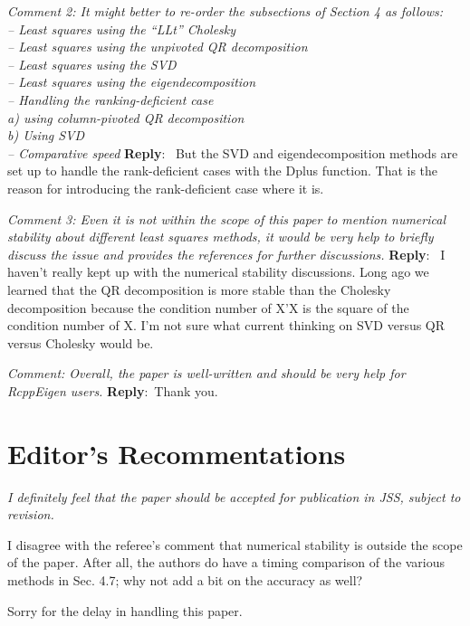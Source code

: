 \documentclass[10pt]{article}
\newcommand{\pointRaised}[2]{\smallskip %
  \textsl{{\fontseries{b}\selectfont #1}: #2}\newline}
\newcommand{\reply}[1]{\textbf{Reply}:\ #1 \smallskip } %
\begin{document}
\pointRaised{Comment 2}{
  It might better to re-order the subsections of Section 4 as follows: \\
  -- Least squares using the ``LLt'' Cholesky \\
  -- Least squares using the unpivoted QR decomposition\\
  -- Least squares using the SVD \\
  -- Least squares using the eigendecomposition \\
  -- Handling the ranking-deficient case \\
  \phantom{---} a) using column-pivoted QR decomposition \\
  \phantom{---} b) Using SVD \\
  -- Comparative speed 
}
\reply{
  But the SVD and eigendecomposition methods are set up to handle
  the rank-deficient cases with the Dplus function.  That is the
  reason for introducing the rank-deficient case where it is.
}

\pointRaised{Comment 3}{
  Even it is not within the scope of this paper to mention
  numerical stability about different least squares methods, 
  it would be very help to briefly discuss the issue and provides
  the references for further discussions. 
}
\reply{
  I haven't really kept up with the numerical stability
  discussions.  Long ago we learned that the QR decomposition is
  more stable than the Cholesky decomposition because the condition
  number of X'X is the square of the condition number of X.  I'm
  not sure what current thinking on SVD versus QR versus Cholesky
  would be.
}


\pointRaised{Comment}{
  Overall, the paper is well-written and should be very help 
  for RcppEigen users. 
}
\reply{Thank you.}


\section*{Editor's Recommentations}

{\sl 
  I definitely feel that the paper should be accepted for publication in
  JSS, subject to revision.
  
  I disagree with the referee's comment that numerical stability is
  outside the scope of the paper. After all, the authors do have a timing
  comparison of the various methods in Sec. 4.7; why not add a bit on the
  accuracy as well?
  
  Sorry for the delay in handling this paper.
}
\end{document}
